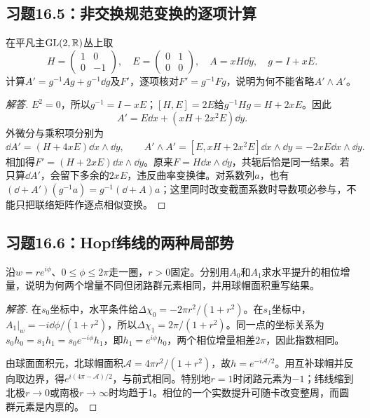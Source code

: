 \subsection*{习题16.5：非交换规范变换的逐项计算}
在平凡主$\mathrm{GL}(2,\mathbb{R})$丛上取
\[
 H=\begin{pmatrix}1&0\\0&-1\end{pmatrix},\quad
 E=\begin{pmatrix}0&1\\0&0\end{pmatrix},\quad
 A=xH\dd y,\quad g=I+xE.
\]
计算$A'=g^{-1}Ag+g^{-1}\dd g$及$F'$，逐项核对$F'=g^{-1}Fg$，说明为何不能省略$A'\wedge A'$。
\begin{proof}[解答]
$E^2=0$，所以$g^{-1}=I-xE$；$[H,E]=2E$给$g^{-1}Hg=H+2xE$。因此
\[
 A'=E\dd x+(xH+2x^2E)\dd y.
\]
外微分与乘积项分别为
\[
 \dd A'=(H+4xE)\dd x\wedge\dd y,\qquad
 A'\wedge A'=[E,xH+2x^2E]\dd x\wedge\dd y
 =-2xE\dd x\wedge\dd y.
\]
相加得$F'=(H+2xE)\dd x\wedge\dd y$。原来$F=H\dd x\wedge\dd y$，共轭后恰是同一结果。若只算$\dd A'$，会留下多余的$2xE$，违反曲率变换律。对系数列$a$，也有$(\dd+A')(g^{-1}a)=g^{-1}(\dd+A)a$；这里同时改变截面系数时导数项必参与，不能只把联络矩阵作逐点相似变换。
\end{proof}

\subsection*{习题16.6：Hopf纬线的两种局部势}
沿$w=re^{i\phi}$、$0\le\phi\le2\pi$走一圈，$r>0$固定。分别用$A_0$和$A_1$求水平提升的相位增量，说明为何两个增量不同但闭路群元素相同，并用球帽面积重写结果。
\begin{proof}[解答]
在$s_0$坐标中，水平条件给$\Delta\chi_0=-2\pi r^2/(1+r^2)$。在$s_1$坐标中，$A_1|_w=-i\dd\phi/(1+r^2)$，所以$\Delta\chi_1=2\pi/(1+r^2)$。同一点的坐标关系为$s_0h_0=s_1h_1=s_0e^{-i\phi}h_1$，即$h_1=e^{i\phi}h_0$，两个相位增量相差$2\pi$，因此指数相同。

由球面面积元，北球帽面积$\mathcal A=4\pi r^2/(1+r^2)$，故$h=e^{-i\mathcal A/2}$。用互补球帽并反向取边界，得$e^{i(4\pi-\mathcal A)/2}$，与前式相同。特别地$r=1$时闭路元素为$-1$；纬线缩到北极$r\to0$或南极$r\to\infty$时均趋于1。相位的一个实数提升可随卡改变整周，而圆群元素是内禀的。
\end{proof}

